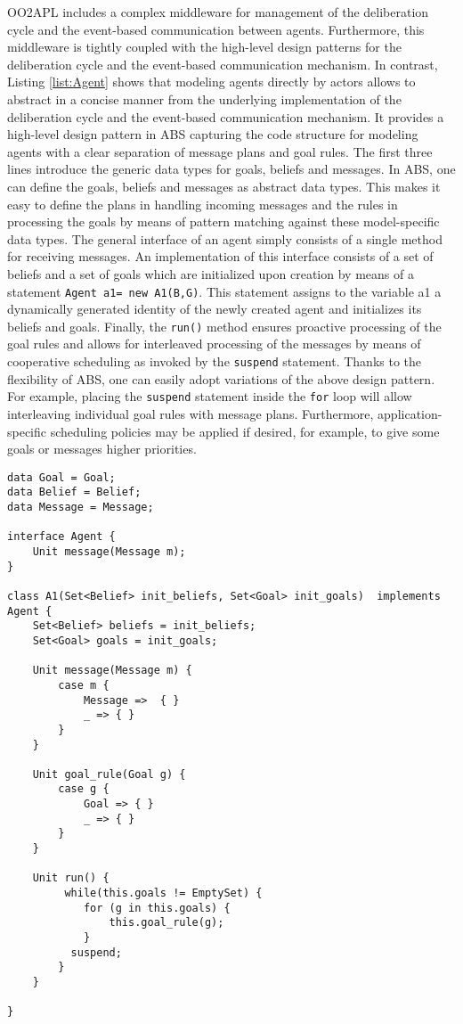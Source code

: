 OO2APL  includes a complex middleware for management of the deliberation cycle and the event-based communication between agents. 
Furthermore, this middleware is tightly coupled with the high-level design patterns for the deliberation cycle and  the event-based communication mechanism.
In contrast,  Listing \ref{list:Agent} shows that modeling agents directly by actors  allows to abstract in a concise manner from the underlying implementation of the deliberation cycle  and the event-based communication mechanism.
It provides  a high-level design pattern in ABS capturing the code structure for modeling agents with a clear separation of message plans and goal rules. 
The first three lines introduce the generic data types for goals, beliefs and messages.
In ABS, one can define the goals, beliefs and messages as abstract data types.
This makes it easy to define the plans in handling incoming messages and the rules in processing the goals by means of pattern matching against these model-specific data types.
The general interface of an agent simply consists of a single method for receiving  messages. An  implementation of this interface consists of a set of beliefs and a set of goals which are initialized upon creation by means of a statement
\lstinline|Agent a1= new A1(B,G)|.
This statement  assigns to the variable a1 a dynamically generated  identity of the newly created agent and initializes its beliefs and goals.
Finally,  the \lstinline|run()| method ensures proactive processing of the goal rules and allows for
interleaved processing of the messages by means of cooperative scheduling as invoked by the \lstinline|suspend| statement.
Thanks to the flexibility of ABS, one can easily adopt variations of the above design pattern.
For example, placing the \lstinline|suspend| statement inside the \lstinline|for| loop will allow interleaving individual goal rules with message plans.
Furthermore, application-specific scheduling policies \cite{rabs,cog}  may be applied if desired, for example, to give some goals or messages higher priorities.



\begin{lstlisting}[caption= Generic Agent Model, label=list:Agent]
data Goal = Goal;
data Belief = Belief;
data Message = Message;

interface Agent {
	Unit message(Message m);
}

class A1(Set<Belief> init_beliefs, Set<Goal> init_goals)  implements Agent {
	Set<Belief> beliefs = init_beliefs;
	Set<Goal> goals = init_goals;
	
	Unit message(Message m) {
		case m { 
			Message =>  { }
			_ => { }
		}
	}
	
	Unit goal_rule(Goal g) {
		case g {
			Goal => { }
			_ => { }
		}
	}
	
	Unit run() {
		 while(this.goals != EmptySet) {
  		    for (g in this.goals) {
		        this.goal_rule(g);
		    }
		  suspend;
		}
	}

}

\end{lstlisting}


